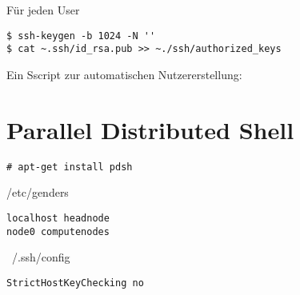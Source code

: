 Für jeden User
\begin{lstlisting}[style=Bash]
$ ssh-keygen -b 1024 -N ''
$ cat ~.ssh/id_rsa.pub >> ~./ssh/authorized_keys
\end{lstlisting}

Ein Sscript zur automatischen Nutzererstellung:


\section{Parallel Distributed Shell}
\begin{lstlisting}[style=Bash]
# apt-get install pdsh
\end{lstlisting}
/etc/genders
\begin{lstlisting}[style=Bash]
localhost headnode
node0 computenodes
\end{lstlisting}
~/.ssh/config
\begin{lstlisting}[style=Bash]
StrictHostKeyChecking no
\end{lstlisting}
